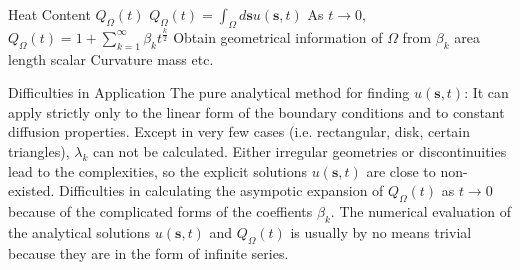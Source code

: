 \documentclass{article}
\begin{document}
\begin{outline}[enumerate]
          
     \2 Heat Content $Q_{\Omega}(t)$
        \3 $Q_{\Omega}(t) = \int_{\Omega} d\bm{s} u(\bm{s}, t)$
        \3 As $t \rightarrow 0$, $Q_{\Omega}(t) = 1 + \sum_{k=1}^{\infty} \beta_kt^{\frac{k}{2}}$ %
        \3 Obtain geometrical information of $\Omega$ from $\beta_k$
          \4 area
          \4 length
          \4 scalar Curvature
          \4 mass
          \4 etc.

   \1 Difficulties in Application
     \2 The pure analytical method for finding $u(\bm{s}, t)$:
        \3 It can apply strictly only to the linear form of the boundary conditions and to constant diffusion properties.
        \3 Except in very few cases (i.e. rectangular, disk, certain triangles), $\lambda_k$ can not be calculated. %
        \3 Either irregular geometries or discontinuities lead to the complexities, so the explicit solutions $u(\bm{s}, t)$ are close to non-existed.
     \2 Difficulties in calculating the asympotic expansion of $Q_{\Omega}(t)$ as $t \rightarrow 0$ because of the complicated forms of the coeffients $\beta_k$.
     \2 The numerical evaluation of the analytical solutions $u(\bm{s}, t)$ and $Q_{\Omega}(t)$ is usually by no means trivial because they are in the form of infinite series.
      




\end{outline}
\end{document}
